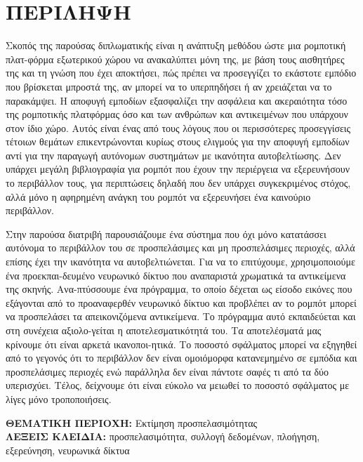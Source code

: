 \documentclass[12pt,a4paper,table,dvipsnames,tikz]{report}
\begin{document}
	
	\chapter*{ΠΕΡΙΛΗΨΗ}
	\thispagestyle{empty}
	
	Σκοπός της παρούσας διπλωματικής είναι η ανάπτυξη μεθόδου ώστε μια ρομποτική 
	πλατ-φόρμα εξωτερικού χώρου να ανακαλύπτει μόνη της, με βάση τους αισθητήρες της 
	και τη γνώση που έχει αποκτήσει, πώς πρέπει να προσεγγίζει το εκάστοτε εμπόδιο 
	που βρίσκεται μπροστά της, αν μπορεί να το υπερπηδήσει ή αν χρειάζεται να το 
	παρακάμψει. Η αποφυγή εμποδίων εξασφαλίζει την ασφάλεια και ακεραιότητα τόσο της 
	ρομποτικής πλατφόρμας όσο και των ανθρώπων και αντικειμένων που υπάρχουν στον 
	ίδιο χώρο. Αυτός είναι ένας από τους λόγους που οι περισσότερες προσεγγίσεις 
	τέτοιων θεμάτων επικεντρώνονται κυρίως στους ελιγμούς για την αποφυγή εμποδίων 
	αντί για την παραγωγή αυτόνομων συστημάτων με ικανότητα αυτοβελτίωσης.
	Δεν υπάρχει μεγάλη βιβλιογραφία για ρομπότ που έχουν την περιέργεια να εξερευνήσουν 
	το περιβάλλον τους, για περιπτώσεις δηλαδή που δεν υπάρχει συγκεκριμένος στόχος, 
	αλλά μόνο η αφηρημένη ανάγκη του ρομπότ να εξερευνήσει ένα καινούριο περιβάλλον.
	\par
	Στην παρούσα διατριβή παρουσιάζουμε ένα σύστημα που όχι μόνο κατατάσσει αυτόνομα 
	το περιβάλλον του σε προσπελάσιμες και μη προσπελάσιμες περιοχές, αλλά επίσης έχει 
	την ικανότητα να αυτοβελτιώνεται.
	Για να το επιτύχουμε, χρησιμοποιούμε ένα προεκπαι-δευμένο νευρωνικό δίκτυο που 
	αναπαριστά χρωματικά τα αντικείμενα της σκηνής. Ανα-πτύσσουμε ένα πρόγραμμα, το οποίο 
	δέχεται ως είσοδο εικόνες που εξάγονται από το προαναφερθέν νευρωνικό δίκτυο και 
	προβλέπει αν το ρομπότ μπορεί να προσπελάσει τα απεικονιζόμενα αντικείμενα. 
	Το πρόγραμμα αυτό εκπαιδεύεται και στη συνέχεια αξιολο-γείται η αποτελεσματικότητά του. 
	Τα αποτελέσματά μας κρίνουμε ότι είναι αρκετά ικανοποι-ητικά. Το ποσοστό σφάλματος 
	μπορεί να εξηγηθεί από το γεγονός ότι το περιβάλλον δεν είναι ομοιόμορφα κατανεμημένο 
	σε εμπόδια και προσπελάσιμες περιοχές ενώ παράλληλα δεν είναι πάντοτε σαφές τι από 
	τα δύο υπερισχύει. Τέλος, δείχνουμε ότι είναι εύκολο να μειωθεί το ποσοστό σφάλματος  
	με λίγες μόνο τροποποιήσεις.
	
	\vfill
	\noindent
	\MakeUppercase{\textbf{Θεματικη Περιοχη: }} Εκτίμηση προσπελασιμότητας
	\\
	\MakeUppercase{\textbf{Λεξεις Κλειδια: }} προσπελασιμότητα, συλλογή δεδομένων, 
	πλοήγηση, εξερεύνηση, νευρωνικά δίκτυα
	
\end{document}
